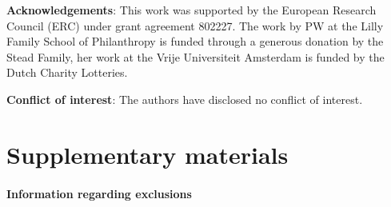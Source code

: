 \documentclass[AER]{AEA}
\begin{document}
\vspace{0.3cm}

\textbf{Acknowledgements}: This work was supported by the European Research Council (ERC) under grant agreement 802227. The work by PW at the Lilly Family School of Philanthropy is funded through a generous donation by the Stead Family, her work at the Vrije Universiteit Amsterdam is funded by the Dutch Charity Lotteries.

\vspace{0.3cm}

\textbf{Conflict of interest}: The authors have disclosed no conflict of interest.

%
%
%
%
%




\appendix

\section{Supplementary materials}

\paragraph{Information regarding exclusions}
\end{document}
